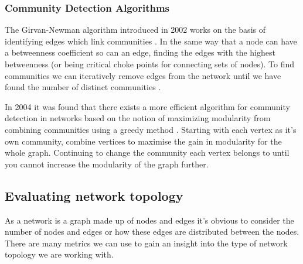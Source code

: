 \documentclass{article}
\begin{document}
\subsubsection{Community Detection Algorithms}
The Girvan-Newman algorithm introduced in 2002 works on the basis of identifying edges which link communities \cite{girvannewman}.
In the same way that a node can have a betweenness coefficient so can an edge, finding the edges with the highest betweenness (or being critical choke points for connecting sets of nodes).
To find communities we can iteratively remove edges from the network until we have found the number of distinct communities \cite{girvannewman}.

In 2004 it was found that there exists a more efficient algorithm for community detection in networks based on the notion of maximizing modularity from combining communities using a greedy method \cite{clausetnewman}.
Starting with each vertex as it's own community, combine vertices to maximise the gain in modularity for the whole graph. Continuing to change the community each vertex belongs to until you cannot increase the modularity of the graph further.

\subsection{Evaluating network topology}
As a network is a graph made up of nodes and edges it's obvious to consider the number of nodes and edges or how these edges are distributed between the nodes.
There are many metrics we can use to gain an insight into the type of network topology we are working with.
\end{document}

